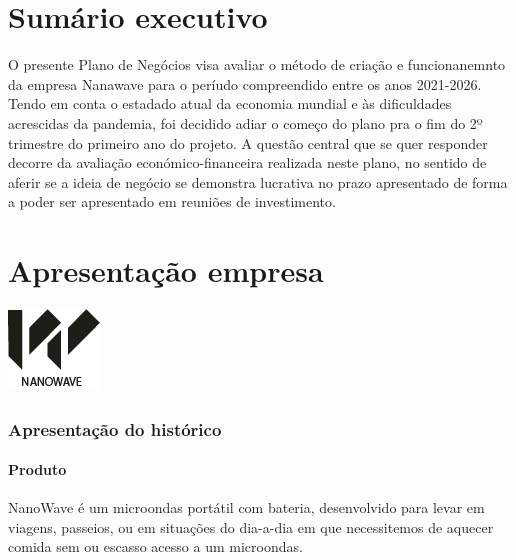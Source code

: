 \documentclass[a4paper]{article}
\begin{document}

\newpage


\tableofcontents



\newpage

\part{Sumário executivo}
O presente Plano de Negócios visa avaliar o método de criação e funcionanemnto da empresa Nanawave para o períudo compreendido entre os anos 2021-2026. Tendo em conta o estadado atual da economia mundial e às dificuldades acrescidas da pandemia, foi decidido adiar o começo do plano pra o fim do 2º trimestre do primeiro ano do projeto. A questão central que se quer responder decorre da avaliação económico-financeira realizada neste plano, no sentido de aferir se a ideia de negócio se demonstra lucrativa no prazo apresentado de forma a poder ser apresentado em reuniões de investimento.

\part{Apresentação empresa}
\includegraphics[scale=1]{LOGO.png}

\section{Apresentação do histórico}
\subsection{Produto}
NanoWave é um microondas portátil com bateria, desenvolvido para levar em viagens, passeios, ou em situações do dia-a-dia em que necessitemos de aquecer comida sem ou escasso acesso a um microondas.
\end{document}
